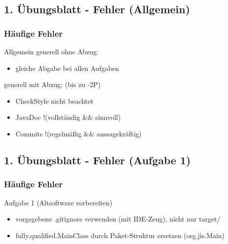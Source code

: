 \documentclass[18pt]{beamer}
\begin{document}
	\subsection{1. Übungsblatt - Fehler (Allgemein)}
	\begin{frame}
		\frametitle{Häufige Fehler}
		\begin{block}{Allgemein}
			generell ohne Abzug:
			\begin{itemize}
				\item gleiche Abgabe bei allen Aufgaben
			\end{itemize}
			\pause
			generell mit Abzug: (bis zu -2P)
			\begin{itemize}
				\item  CheckStyle nicht beachtet
				\item JavaDoc !(vollständig \&\& sinnvoll)
				\item Commits !(regelmäßig \&\& aussagekräftig)
			\end{itemize}
		\end{block}
	\end{frame}
	
	\subsection{1. Übungsblatt - Fehler (Aufgabe 1)}
	\begin{frame}
		\frametitle{Häufige Fehler}
		\begin{block}{Aufgabe 1 (Altsoftware vorbereiten)}
		\begin{itemize}
			\item vorgegebene .gitignore verwenden (mit IDE-Zeug), nicht nur target/ \pause
			\item fully.qualified.MainClass durch Paket-Struktur ersetzen (org.jis.Main)
		\end{itemize}
		\end{block}
	\end{frame}
	
\end{document}
